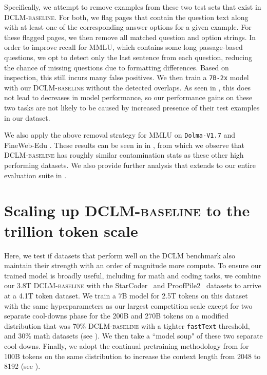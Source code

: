 \documentclass{article}
\newcommand{\dclm}{\textsc{DCLM}\xspace}
\newcommand{\hqpool}{\textsc{DCLM-baseline}\xspace}
\newcommand{\xltrack}{\texttt{7B-2x}\xspace}
\newcommand{\dolmalatest}{\texttt{Dolma-V1.7}\xspace}
\newcommand{\fasttext}{\texttt{fastText}\xspace}
\begin{document}
Specifically, we attempt to remove examples from these two test sets that exist in \hqpool.
For both, we flag pages that contain the question text along with at least one of the corresponding answer options for a given example. For these flagged pages, we then remove all matched question and option strings.
In order to improve recall for MMLU, which contains some long passage-based questions, we opt to detect only the last sentence from each question, reducing the chance of missing questions due to formatting differences. Based on inspection, this still incurs many false positives.
We then train a \xltrack model with our \hqpool without the detected overlaps. As seen in , this does not lead to decreases in model performance, so our performance gains on these two tasks are not likely to be caused by increased presence of their test examples in our dataset.




We also apply the above removal strategy for MMLU on \dolmalatest \citep{soldaini2024dolma} and FineWeb-Edu \citep{lozhkov2024fineweb-edu}.
These results can be seen in  in , from which we observe that
\hqpool has roughly similar contamination stats as these other high performing datasets.
We also provide further analysis that extends to our entire evaluation suite in .


%
\section{Scaling up \hqpool to the trillion token scale}
\label{sec:hero_run}
%

Here, we test if datasets that perform well on the \dclm benchmark also maintain their strength with an order of magnitude more compute.
To ensure our trained model is broadly useful, including for math and coding tasks, we combine our 3.8T \hqpool{} with
the StarCoder~\citep{li2023starcoder} and ProofPile2~\citep{azerbayev2023llemma} datasets to arrive at a 4.1T token dataset.
We train a 7B model for 2.5T tokens on this dataset with the same hyperparameters as our largest competition scale except for two separate cool-downs phase for the 200B and 270B tokens on a modified distribution that was 70\% \hqpool with a tighter \fasttext threshold, and 30\% math datasets (see ). We then take a ``model soup" of these two separate cool-downs\citep{wortsman2022model}. Finally, we adopt the continual pretraining methodology from \citet{pouransari2024dataset} for 100B tokens on the same distribution to increase the context length from 2048 to 8192 (see ).
\end{document}

